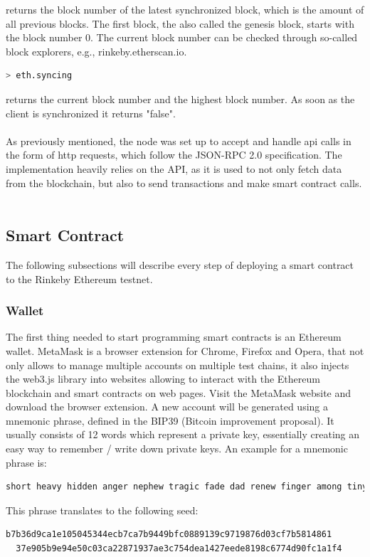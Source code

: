 returns the block number of the latest synchronized block, which is the amount of all previous blocks.
The first block, the also called the genesis block, starts with the block number 0.
The current block number can be checked through so-called block explorers, e.g., {rinkeby.etherscan.io}.
\\
\begin{lstlisting}[language=bash, numbers=none]
  > eth.syncing
\end{lstlisting}
returns the current block number and the highest block number.
As soon as the client is synchronized it returns "false"\cite{javascript-0.20}.
\\\\
As previously mentioned, the node was set up to accept and handle api calls in the form of http requests, which follow the JSON-RPC 2.0 specification\cite{json-rpc-spec}.
The implementation heavily relies on the API, as it is used to not only fetch data from the blockchain, but also to send transactions and make smart contract calls\cite{json-rpc}\cite{management-apis}.
\\\\
\subsection{Smart Contract}
The following subsections will describe every step of deploying a smart contract to the Rinkeby Ethereum testnet.
\\ 
\subsubsection{Wallet}
The first thing needed to start programming smart contracts is an Ethereum wallet.
MetaMask is a browser extension for Chrome, Firefox and Opera, that not only allows to manage multiple accounts on multiple test chains, it also injects the web3.js library into websites allowing to interact with the Ethereum blockchain and smart contracts on web pages.
Visit the MetaMask\cite{metamask} website and download the browser extension.
A new account will be generated using a mnemonic phrase, defined in the BIP39 (Bitcoin improvement proposal)\cite{bip39}.
It usually consists of 12 words which represent a private key, essentially creating an easy way to remember / write down private keys.
An example for a mnemonic phrase is:
\begin{lstlisting}[language=bash, numbers=none]
  short heavy hidden anger nephew tragic fade dad renew finger among tiny
\end{lstlisting}
This phrase translates to the following seed:
\begin{lstlisting}[language=bash, numbers=none]
  b7b36d9ca1e105045344ecb7ca7b9449bfc0889139c9719876d03cf7b5814861
  37e905b9e94e50c03ca22871937ae3c754dea1427eede8198c6774d90fc1a1f4
\end{lstlisting}

